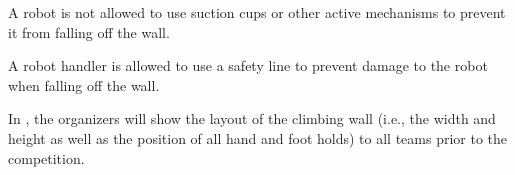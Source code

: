 \documentclass[12pt]{hurocup}
\begin{document}

\begin{lawlist}[CW]

\item A robot is not allowed to use suction cups or other active
  mechanisms to prevent it from falling off the wall.
\end{lawlist}

\begin{decisions}
\item A robot handler is allowed to use a safety line to prevent
  damage to the robot when falling off the wall.

\item In \thisyear, the organizers will show the layout of the
  climbing wall (i.e., the width and height as well as the position of
  all hand and foot holds) to all teams prior to the competition.
\end{decisions}

\label{rd:scoring}
\end{document}
